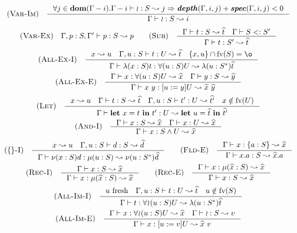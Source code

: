 \[\begin{array}{c}
    \RULE{Var-Im} \quad \inference{
        \forall j \in \DOM{\Gamma - i} .
            \TJ{\Gamma - i}{\IMP}{S}{j} \Rightarrow
            \DEPTH{\Gamma, i, j} + \SPEC{\Gamma, i, j} < 0
    }{
        \TJ{\Gamma}{\IMP}{S}{i}
    } \\[4mm]

    \RULE{Var-Ex} \quad \TJ{\Gamma, p: S, \Gamma'}{p}{S}{p} \qquad

    \RULE{Sub} \quad \inference{
        \TJ{\Gamma}{t}{S}{\HAT{t}} \quad
        \SJ{\Gamma}{S}{S'}
    }{
        \TJ{\Gamma}{t}{S'}{\HAT{t}}
    } \\[4mm]

    \RULE{All-Ex-I} \quad \inference{
        x \leadsto u \quad
        \TJ{\Gamma, u: S}{t}{U}{\HAT{t}} \quad
        \{x, u\} \cap \FV{S} = \o
    }{
        \TJ{\Gamma}{\ABS{x}{S}{t}}{\DFUN{u}{S}{U}}{\ABS{u}{\TRANS{S}}{\HAT{t}}}
    } \\[4mm]

    \RULE{All-Ex-E} \quad \inference{
        \TJ{\Gamma}{x}{\DFUN{u}{S}{U}}{\HAT{x}} \quad
        \TJ{\Gamma}{y}{S}{\HAT{y}}
    }{
        \TJ{\Gamma}{x\ y}{\SUB{u}{y}U}{\HAT{x}\ \HAT{y}}
    } \\[4mm]

    \RULE{Let} \quad \inference{
        x \leadsto u \quad
        \TJ{\Gamma}{t}{S}{\HAT{t}} \quad
        \TJ{\Gamma, u: S}{t'}{U}{\HAT{t'}} \quad
        x \notin \FV{U}
    }{
        \TJ{\Gamma}{\LET{x}{t}{t'}}{U}{\LET{u}{\HAT{t}}{\HAT{t'}}}
    } \\[4mm]

    \RULE{And-I} \quad \inference{
        \TJ{\Gamma}{x}{S}{\HAT{x}} \quad
        \TJ{\Gamma}{x}{U}{\HAT{x}}
    }{
        \TJ{\Gamma}{x}{\AGG{S}{U}}{\HAT{x}}
    } \\[4mm]

    \RULE{\{\}-I} \quad \inference{
        x \leadsto u \quad
        \TJ{\Gamma, u: S}{d}{S}{\HAT{d}}
    }{
        \TJ{\Gamma}{\OBJ{x}{S}{d}}{\REC{u}{S}}{\OBJ{u}{\TRANS{S}}{\HAT{d}}}
    } \qquad

    \RULE{Fld-E} \quad \inference{
        \TJ{\Gamma}{x}{\FDEC{a}{S}}{\HAT{x}}
    }{
        \TJ{\Gamma}{x.a}{S}{\HAT{x}.a}
    } \\[4mm]

    \RULE{Rec-I} \quad \inference{
        \TJ{\Gamma}{x}{S}{\HAT{x}}
    }{
        \TJ{\Gamma}{x}{\REC{\HAT{x}}{S}}{\HAT{x}}
    } \qquad

    \RULE{Rec-E} \quad \inference{
        \TJ{\Gamma}{x}{\REC{\HAT{x}}{S}}{\HAT{x}}
    }{
        \TJ{\Gamma}{x}{S}{\HAT{x}}
    } \\[4mm]

    \RULE{All-Im-I} \quad \inference{
        u\ \text{fresh} \quad
        \TJ{\Gamma, u: S}{t}{U}{\HAT{t}} \quad
        u \notin \FV{S}
    }{
        \TJ{\Gamma}{t}{\IFUN{u}{S}{U}}{\ABS{u}{\TRANS{S}}{\HAT{t}}}
    } \\[4mm]

    \RULE{All-Im-E} \quad \inference{
        \TJ{\Gamma}{x}{\IFUN{u}{S}{U}}{\HAT{x}} \quad
        \TJ{\Gamma}{\IMP}{S}{v}
    }{
        \TJ{\Gamma}{x}{\SUB{u}{v}U}{\HAT{x}\ v}
    }
\end{array}\]
